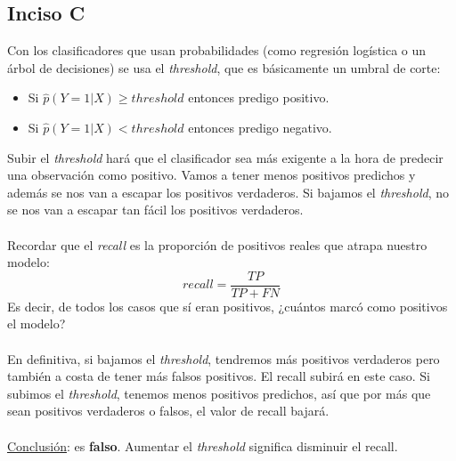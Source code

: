 \documentclass{article}
\begin{document}
        \subsection*{Inciso C}
            Con los clasificadores que usan probabilidades (como regresión logística o un árbol de decisiones) se usa el \textit{threshold}, que es básicamente un umbral de corte:
            \begin{itemize}
                \item Si $\hat{p}(Y=1 | X) \geq threshold$ entonces predigo positivo.
                \item Si $\hat{p}(Y=1 | X) < threshold$ entonces predigo negativo.
            \end{itemize}
            Subir el \textit{threshold} hará que el clasificador sea más exigente a la hora de predecir una observación como positivo. Vamos a tener menos positivos predichos y además se nos van a escapar los positivos verdaderos. Si bajamos el \textit{threshold}, no se nos van a escapar tan fácil los positivos verdaderos. \\
            \\
            Recordar que el \textit{recall} es la proporción de positivos reales que atrapa nuestro modelo:
            \[ recall = \frac{TP}{TP+FN} \]
            Es decir, de todos los casos que sí eran positivos, ¿cuántos marcó como positivos el modelo? \\
            \\
            En definitiva, si bajamos el \textit{threshold}, tendremos más positivos verdaderos pero también a costa de tener más falsos positivos. El recall subirá en este caso. Si subimos el \textit{threshold}, tenemos menos positivos predichos, así que por más que sean positivos verdaderos o falsos, el valor de recall bajará. \\
            \\
            \underline{Conclusión}: es \textbf{falso}. Aumentar el \textit{threshold} significa disminuir el recall.
\end{document}
